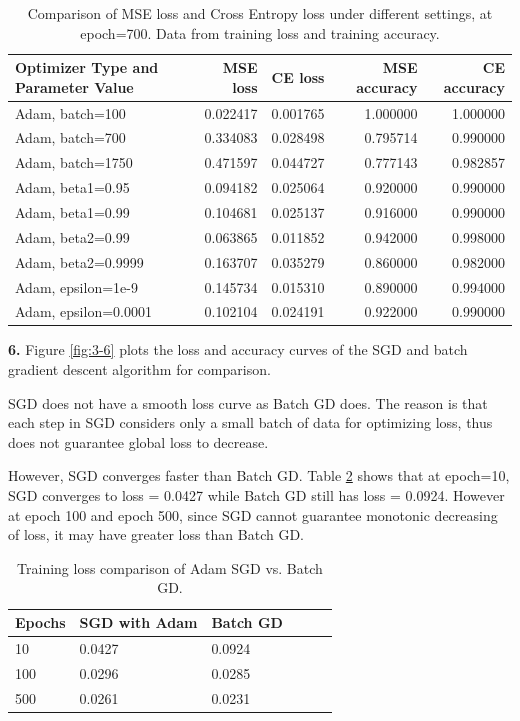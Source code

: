 \documentclass[12pt]{article}
\newenvironment{problem}[2][Problem]{\begin{trivlist}
\item[\hskip \labelsep {\bfseries #1}\hskip \labelsep {\bfseries #2.}]}{\end{trivlist}}
\begin{document}
\begin{problem}{3}
\begin{table}[!htb]
\center
\begin{tabular}{|l|r|r|r|r|}
\hline
                Optimizer Type and Parameter Value  &       MSE loss &        CE loss &     MSE accuracy &      CE accuracy \\
\hline
       Adam, batch=100 &  0.022417 &  0.001765 & 1.000000 &  1.000000  \\
       Adam, batch=700 &  0.334083 &  0.028498 & 0.795714 &  0.990000 \\
      Adam, batch=1750 &   0.471597 &  0.044727 & 0.777143 &  0.982857  \\
\hline
      Adam, beta1=0.95 &  0.094182 &  0.025064 &0.920000 &  0.990000 \\
      Adam, beta1=0.99 &  0.104681 &  0.025137 & 0.916000 &  0.990000 \\
\hline
      Adam, beta2=0.99 &   0.063865 &  0.011852 & 0.942000 &  0.998000  \\
    Adam, beta2=0.9999 & 0.163707 &  0.035279 &  0.860000 &  0.982000  \\
\hline
    Adam, epsilon=1e-9 &   0.145734 &  0.015310 & 0.890000 &  0.994000 \\
  Adam, epsilon=0.0001 &  0.102104 &  0.024191 & 0.922000 &  0.990000   \\
\hline
\end{tabular}
\caption{Comparison of MSE loss and Cross Entropy loss under different settings, at epoch=700. Data from training loss and training accuracy.}
\label{table:3-5}
\end{table}

\bigskip



\textbf{6. } Figure \ref{fig:3-6} plots the loss and accuracy curves of the SGD and batch gradient descent algorithm for comparison.

SGD does not have a smooth loss curve as Batch GD does. The reason is that each step in SGD considers only a small batch of data for optimizing loss, thus does not guarantee global loss to decrease.

However, SGD converges faster than Batch GD. Table \ref{table:3-6} shows that at epoch=10, SGD converges to loss = 0.0427 while Batch GD still has loss = 0.0924. However at epoch 100 and epoch 500, since SGD cannot guarantee monotonic decreasing of loss, it may have greater loss than Batch GD.

\begin{table}[!htb]
\center
\begin{tabular}{|l|l|l|l|l|l|}
\hline
Epochs & SGD with Adam & Batch GD     \\ \hline
10  & 0.0427 & 0.0924  \\ \hline
100  & 0.0296 & 0.0285  \\ \hline
500  & 0.0261 & 0.0231  \\ \hline
\end{tabular}
\caption{Training loss comparison of Adam SGD vs. Batch GD.}
\label{table:3-6}
\end{table}


\end{problem}
\end{document}
